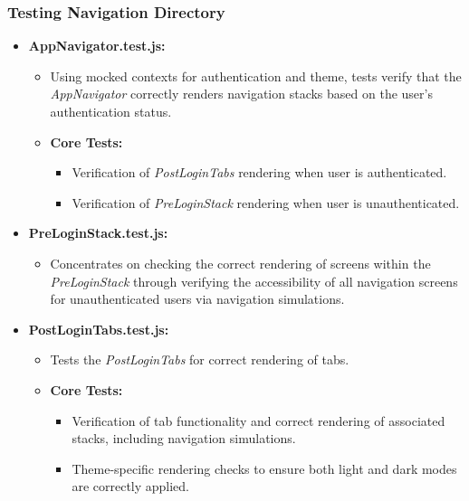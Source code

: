 \subsubsection{Testing Navigation Directory}

\begin{itemize}
    \item \textbf{AppNavigator.test.js:}
    \begin{itemize}
        \item Using mocked contexts for authentication and theme, tests verify that the \textit{AppNavigator} correctly renders navigation stacks based on the user's authentication status.
        \item \textbf{Core Tests:}
        \begin{itemize}
            \item Verification of \textit{PostLoginTabs} rendering when user is authenticated.
            \item Verification of \textit{PreLoginStack} rendering when user is unauthenticated.
        \end{itemize}
    \end{itemize}

    \item \textbf{PreLoginStack.test.js:}
    \begin{itemize}
        \item Concentrates on checking the correct rendering of screens within the \textit{PreLoginStack} through verifying the accessibility of all navigation screens for unauthenticated users via navigation simulations.
    \end{itemize}

    \item \textbf{PostLoginTabs.test.js:}
    \begin{itemize}
        \item Tests the \textit{PostLoginTabs} for correct rendering of tabs.
        \item \textbf{Core Tests:}
        \begin{itemize}
            \item Verification of tab functionality and correct rendering of associated stacks, including navigation simulations.
            \item Theme-specific rendering checks to ensure both light and dark modes are correctly applied.
        \end{itemize}
    \end{itemize}
    

\end{itemize}
